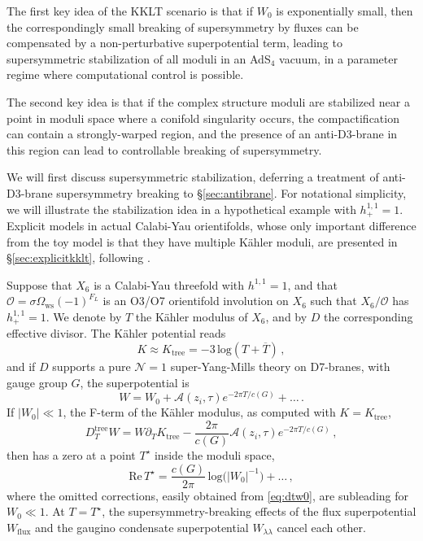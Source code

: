 \documentclass[12pt,a4wide]{article}
\begin{document}
The first key idea of the KKLT scenario is that if $W_0$ is exponentially small, then the correspondingly small breaking of supersymmetry by fluxes can be compensated by a non-perturbative superpotential term, leading to supersymmetric stabilization of all moduli in an AdS$_4$ vacuum, in a parameter regime where computational control is possible.

The second key idea is that if the complex structure moduli are stabilized near a point in moduli space where a conifold singularity occurs, the compactification can contain a strongly-warped region, and the presence of an anti-D3-brane in this region can lead to controllable breaking of supersymmetry.

We will first discuss supersymmetric stabilization, deferring a treatment of anti-D3-brane supersymmetry breaking to \S\ref{sec:antibrane}.  For notational simplicity, we will illustrate the stabilization idea in a hypothetical example with $h^{1,1}_+=1$.  Explicit models in actual Calabi-Yau orientifolds, whose only important difference from the toy model is that they have multiple K\"ahler moduli, are presented in \S\ref{sec:explicitkklt}, following \cite{Demirtas:2021nlu}.

Suppose that $X_6$ is a Calabi-Yau threefold with $h^{1,1}=1$, and that $\mathcal{O} = \sigma \Omega_{\text{ws}} (-1)^{F_L}$ is an O3/O7 orientifold involution on $X_6$ such that $X_6/\mathcal{O}$ has $h^{1,1}_+=1$.  We denote by $T$ the K\"ahler modulus of $X_6$, and by $D$ the corresponding effective divisor.
The K\"ahler potential reads
\begin{equation}
    K \approx K_{\text{tree}} = - 3\,\text{log}(T+\overline{T})\,,
\end{equation} and if $D$ supports a pure $\mathcal{N}=1$ super-Yang-Mills theory on D7-branes, with gauge group $G$, the superpotential is
\begin{equation}\label{eq:kkltw1}
    W = W_0 + \mathcal{A}(z_i,\tau)e^{-2\pi T/c(G)} + \ldots \,.
\end{equation}   
If $|W_0| \ll 1$, the F-term of the K\"ahler modulus, as computed with $K=K_{\text{tree}}$,
\begin{equation}\label{eq:dtw0}
D^{{\text{tree}}}_{T}W = W \partial_{T} K_{\text{tree}} - \frac{2\pi}{c(G)}\mathcal{A}(z_i,\tau)e^{-2\pi T/c(G)}\,,
\end{equation} then has a zero at a point $T^\star$ inside the moduli space,
\begin{equation}\label{eq:tstar}
\text{Re}\,T^\star = \frac{c(G)}{2\pi}\,\text{log}\bigl(|W_0|^{-1}\bigr)+\ldots \,,
\end{equation}
where the omitted corrections, easily obtained from \eqref{eq:dtw0}, are subleading for $W_0 \ll 1$.
At $T=T^\star$, the supersymmetry-breaking effects of the flux superpotential $W_{\text{flux}}$ and the gaugino condensate superpotential  $W_{{\lambda\lambda}}$ cancel each other.
\end{document}
